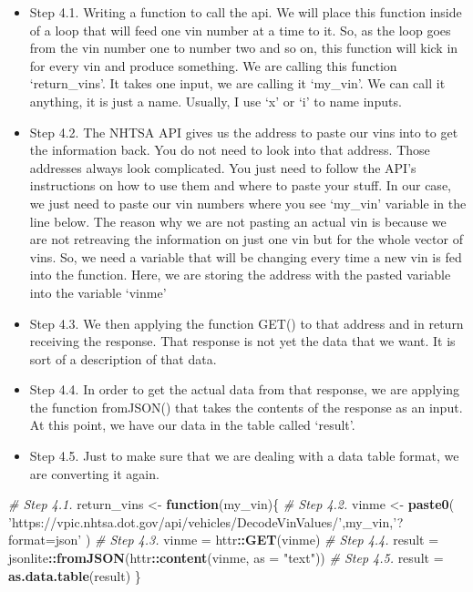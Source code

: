 \documentclass[]{book}
\newenvironment{Shaded}{\begin{snugshade}}{\end{snugshade}}
\newcommand{\CommentTok}[1]{\textcolor[rgb]{0.56,0.35,0.01}{\textit{#1}}}
\newcommand{\ControlFlowTok}[1]{\textcolor[rgb]{0.13,0.29,0.53}{\textbf{#1}}}
\newcommand{\DataTypeTok}[1]{\textcolor[rgb]{0.13,0.29,0.53}{#1}}
\newcommand{\KeywordTok}[1]{\textcolor[rgb]{0.13,0.29,0.53}{\textbf{#1}}}
\newcommand{\NormalTok}[1]{#1}
\newcommand{\OperatorTok}[1]{\textcolor[rgb]{0.81,0.36,0.00}{\textbf{#1}}}
\newcommand{\StringTok}[1]{\textcolor[rgb]{0.31,0.60,0.02}{#1}}
\begin{document}
\begin{itemize}
\item
  Step 4.1. Writing a function to call the api. We will place this function inside of a loop that will feed one vin number at a time to it. So, as the loop goes from the vin number one to number two and so on, this function will kick in for every vin and produce something. We are calling this function `return\_vins'. It takes one input, we are calling it `my\_vin'. We can call it anything, it is just a name. Usually, I use `x' or `i' to name inputs.
\item
  Step 4.2. The NHTSA API gives us the address to paste our vins into to get the information back. You do not need to look into that address. Those addresses always look complicated. You just need to follow the API's instructions on how to use them and where to paste your stuff. In our case, we just need to paste our vin numbers where you see `my\_vin' variable in the line below. The reason why we are not pasting an actual vin is because we are not retreaving the information on just one vin but for the whole vector of vins. So, we need a variable that will be changing every time a new vin is fed into the function. Here, we are storing the address with the pasted variable into the variable `vinme'
\item
  Step 4.3. We then applying the function GET() to that address and in return receiving the response. That response is not yet the data that we want. It is sort of a description of that data.
\item
  Step 4.4. In order to get the actual data from that response, we are applying the function fromJSON() that takes the contents of the response as an input. At this point, we have our data in the table called `result'.
\item
  Step 4.5. Just to make sure that we are dealing with a data table format, we are converting it again.
\end{itemize}

\begin{Shaded}
\begin{Highlighting}[]
\CommentTok{# Step 4.1.}
\NormalTok{return_vins <-}\StringTok{  }\ControlFlowTok{function}\NormalTok{(my_vin)\{}
\CommentTok{# Step 4.2.}
\NormalTok{  vinme <-}\StringTok{ }\KeywordTok{paste0}\NormalTok{(}
    \StringTok{'https://vpic.nhtsa.dot.gov/api/vehicles/DecodeVinValues/'}\NormalTok{,my_vin,}\StringTok{'?format=json'}
\NormalTok{    )}
\CommentTok{# Step 4.3. }
\NormalTok{  vinme =}\StringTok{ }\NormalTok{httr}\OperatorTok{::}\KeywordTok{GET}\NormalTok{(vinme)}
\CommentTok{# Step 4.4.}
\NormalTok{  result =}\StringTok{ }\NormalTok{jsonlite}\OperatorTok{::}\KeywordTok{fromJSON}\NormalTok{(httr}\OperatorTok{::}\KeywordTok{content}\NormalTok{(vinme, }\DataTypeTok{as =} \StringTok{"text"}\NormalTok{)) }
\CommentTok{# Step 4.5.}
\NormalTok{  result =}\StringTok{ }\KeywordTok{as.data.table}\NormalTok{(result)}
\NormalTok{\}}
\end{Highlighting}
\end{Shaded}
\end{document}
